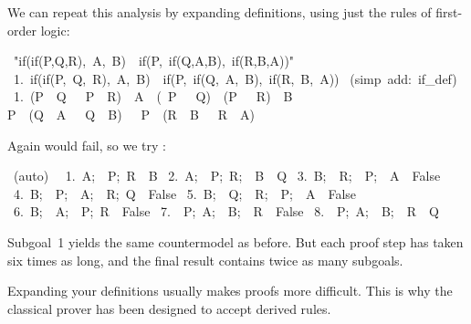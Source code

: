 We can repeat this analysis by expanding definitions, using just the rules of
first-order logic:
\begin{isabelle}
\ "if(if(P,Q,R),\ A,\ B)\ <->\ if(P,\ if(Q,A,B),\ if(R,B,A))"\isanewline
\ 1.\ if(if(P,\ Q,\ R),\ A,\ B)\ \isasymlongleftrightarrow \ if(P,\ if(Q,\ A,\ B),\ if(R,\ B,\
A))
\isanewline
{}\ (simp\ add:\ if\_def)\isanewline
\ 1.\ (P\ \isasymand \ Q\ \isasymor \ \isasymnot \ P\ \isasymand \ R)\ \isasymand \ A\ \isasymor \ (\isasymnot \ P\ \isasymor \ \isasymnot \ Q)\ \isasymand \ (P\ \isasymor \ \isasymnot \ R)\ \isasymand \ B\ \isasymlongleftrightarrow \isanewline
\isaindent{\ 1.\ }P\ \isasymand \ (Q\ \isasymand \ A\ \isasymor \ \isasymnot \ Q\ \isasymand \ B)\ \isasymor \ \isasymnot \ P\ \isasymand \ (R\ \isasymand \ B\ \isasymor \ \isasymnot \ R\ \isasymand \ A)
\end{isabelle}
Again  would fail, so we try :
\begin{isabelle}
\ (auto)\ \isanewline
\ 1.\ \isasymlbrakk A;\ \isasymnot \ P;\ R\isasymrbrakk \ \isasymLongrightarrow \ B\isanewline
\ 2.\ \isasymlbrakk A;\ \isasymnot \ P;\ R;\ \isasymnot \ B\isasymrbrakk \ \isasymLongrightarrow \ Q\isanewline
\ 3.\ \isasymlbrakk B;\ \isasymnot \ R;\ \isasymnot \ P;\ \isasymnot \ A\isasymrbrakk \ \isasymLongrightarrow \ False\isanewline
\ 4.\ \isasymlbrakk B;\ \isasymnot \ P;\ \isasymnot \ A;\ \isasymnot \ R;\ Q\isasymrbrakk \ \isasymLongrightarrow \ False\isanewline
\ 5.\ \isasymlbrakk B;\ \isasymnot \ Q;\ \isasymnot \ R;\ \isasymnot \ P;\ \isasymnot \ A\isasymrbrakk \ \isasymLongrightarrow \ False\isanewline
\ 6.\ \isasymlbrakk B;\ \isasymnot \ A;\ \isasymnot \ P;\ R\isasymrbrakk \ \isasymLongrightarrow \ False\isanewline
\ 7.\ \isasymlbrakk \isasymnot \ P;\ A;\ \isasymnot \ B;\ \isasymnot \ R\isasymrbrakk \ \isasymLongrightarrow \ False\isanewline
\ 8.\ \isasymlbrakk \isasymnot \ P;\ A;\ \isasymnot \ B;\ \isasymnot \ R\isasymrbrakk \ \isasymLongrightarrow \ Q%
\end{isabelle}
Subgoal~1 yields the same countermodel as before.  But each proof step has
taken six times as long, and the final result contains twice as many subgoals.

Expanding your definitions usually makes proofs more difficult.  This is
why the classical prover has been designed to accept derived rules.


